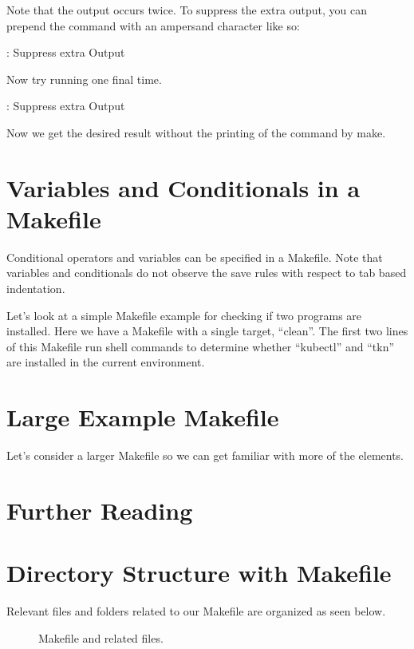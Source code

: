 \justify{}
Note that the output occurs twice. To suppress the extra output, you can prepend the command with an ampersand character like so:

\begin{mybox}{\thetcbcounter: Suppress extra Output}
	
\end{mybox}

\justify{}
Now try running one final time.

\begin{mybox}{\thetcbcounter: Suppress extra Output}
	
\end{mybox}

\justify{}
Now we get the desired result without the printing of the command
by make.

\section{Variables and Conditionals in a Makefile}

\justify{}
Conditional operators and variables can be specified in a Makefile. Note that variables and conditionals do not observe the save rules with respect to tab based indentation.

\justify{}
Let's look at a simple Makefile example for checking if two programs are installed. Here we have a Makefile
with a single target, ``clean''. The first two lines of this Makefile run shell commands to determine
whether ``kubectl'' and ``tkn'' are installed in the current environment.

\begin{mybox}{\thetcbcounter: Conditionals and Variable Example}
	}}code/23-makefiles/6b-Makefile}
\end{mybox}

\section{Large Example Makefile}
\justify{}
Let's consider a larger Makefile so we can get familiar with more of the elements.



\section{Further Reading}

\section{Directory Structure with Makefile}
\justify{}
Relevant files and folders related to our Makefile are organized as seen
below.

\begin{figure}[!htb]
	
	\caption{Makefile and related files.}
\label{makefile}
\end{figure}

